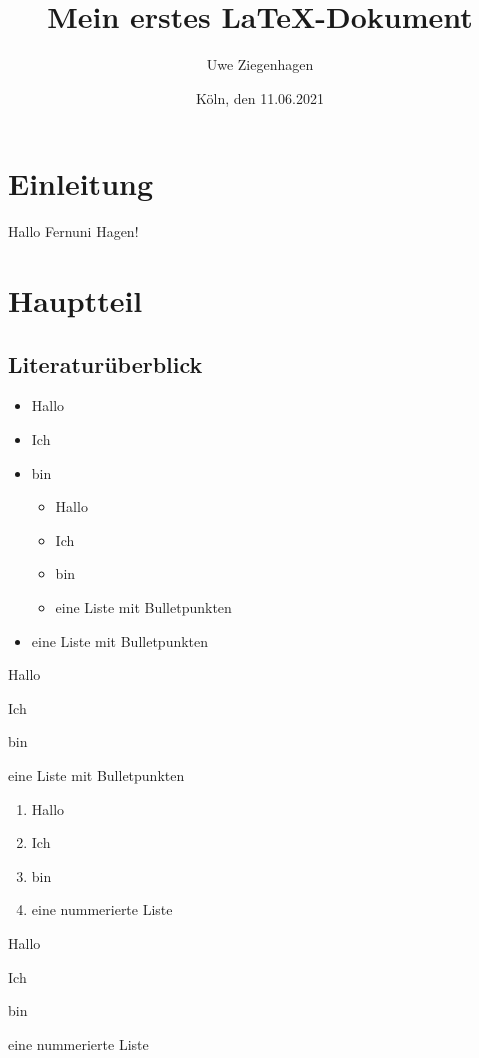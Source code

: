 \documentclass[ngerman,12pt]{scrartcl}
\title{Mein erstes \LaTeX-Dokument}
\author{Uwe Ziegenhagen}
\date{Köln, den 11.06.2021}
\begin{document}
\maketitle

\tableofcontents

\section{Einleitung}

Hallo Fernuni Hagen! 

\section{Hauptteil}
\subsection{Literaturüberblick}

\begin{itemize}
\item Hallo
\item Ich 
\item bin 

\begin{itemize}
\item Hallo
\item Ich 
\item bin 
\item eine Liste mit Bulletpunkten
\end{itemize}

\item eine Liste mit Bulletpunkten
\end{itemize}

\begin{compactitem}[?]
\item Hallo
\item Ich 
\item bin 
\item eine Liste mit Bulletpunkten
\end{compactitem}

\begin{enumerate}[I] %
\item Hallo
\item Ich 
\item bin 
\item eine nummerierte Liste
\end{enumerate}

\begin{compactenum}
\item Hallo
\item Ich 
\item bin 
\item eine nummerierte Liste
\end{compactenum}
\end{document}
